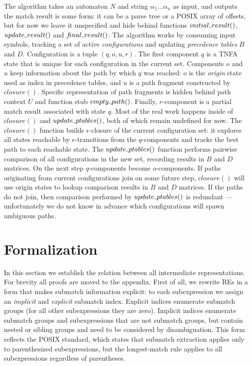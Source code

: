 \documentclass[AMA,STIX1COL]{WileyNJD-v2}
\newcommand{\Xund}{\rule{.4em}{.4pt}}
\begin{document}
The algorithm takes an automaton $N$ and string $\alpha_1 \!\hdots\! \alpha_n$ as input,
and outputs the match result is some form: it can be a parse tree or a POSIX array of offsets,
but for now we leave it unspecified and hide behind functions
$initial \Xund result ()$, $update \Xund result ()$ and $f\!inal \Xund result ()$.
The algorithm works by consuming input symbols,
tracking a set of active \emph{configurations}
and updating \emph{precedence tables} $B$ and $D$.
Configuration is a tuple $(q, o, u, r)$.
The first component $q$ is a TNFA state that is unique for each configuration in the current set.
Components $o$ and $u$ keep information about the path by which $q$ was reached:
$o$ is the \emph{origin} state used as index in precedence tables,
and $u$ is a path fragment constructed by $closure()$.
Specific representation of path fragments is hidden behind path context $U$ and function stub $empty \Xund path ()$.
Finally, $r$-component is a partial match result associated with state $q$.
Most of the real work happens inside of $closure()$ and $update \Xund ptables ()$, both of which remain undefined for now.
The $closure()$ function builds $\epsilon$-closure of the current configuration set:
it explores all states reachable by $\epsilon$-transitions from the $q$-components
and tracks the best path to each reachable state.
The $update \Xund ptables ()$ function
performs pairwise comparison of all configurations in the new set,
recording results in $B$ and $D$ matrices.
On the next step $q$-components become $o$-components.
If paths originating from current configurations join on some future step,
$closure ()$ will use origin states to lookup comparison results in $B$ and $D$ matrices.
If the paths do not join, then comparison performed by $update \Xund ptables ()$ is redundant ---
unfortunately we do not know in advance which configurations will spawn ambiguous paths.
\\


\section{Formalization}\label{section_formalization}

In this section we establish the relation between all intermediate representations.
For brevity all proofs are moved to the appendix.
%
First of all, we rewrite REs in a form that makes submatch information explicit:
to each subexpression we assign an \emph{implicit} and \emph{explicit} submatch index.
Explicit indices enumerate submatch groups (for all other subexpressions they are zero).
Implicit indices enumerate submatch groups and subexpressions that are not submatch groups,
but contain nested or sibling groups and need to be considered by disambiguation.
This form reflects the POSIX standard, which states that
submatch extraction applies only to parenthesized subexpressions,
but the longest-match rule applies to all subexpressions regardless of parentheses.
\end{document}
